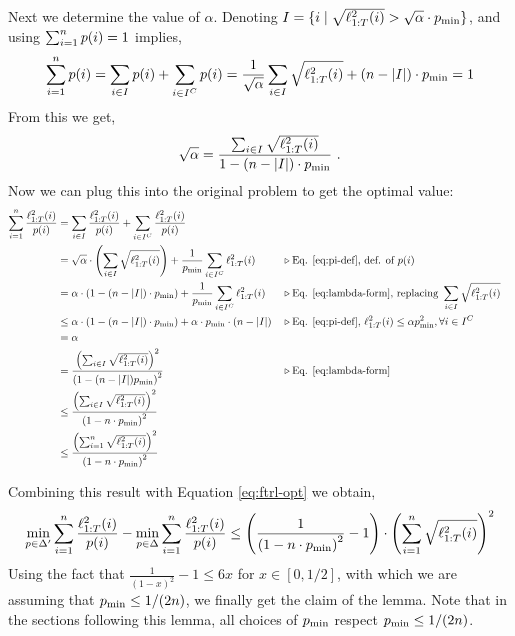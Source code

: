 \begin{proofarg}{}
Next we determine the value of $\alpha$. Denoting $I=\{ i \mid \sqrt{\ell_{1:T}^2(i)}>\sqrt{\alpha} \cdot p_{\text{min}}\}$,  and using   $\sum_{i=1}^n p(i)=1$ implies,
\begin{equation*}
\sum_{i=1}^n p(i) =\sum_{i\in I} p(i) + \sum_{i \in I^C} p(i) = \frac{1}{\sqrt{\alpha}} \sum_{i\in I}\sqrt{\ell_{1:T}^2(i)} + (n-|I|) \cdot p_{\text{min}} = 1
\end{equation*}
From this we get,
\begin{equation} \label{eq:lambda-form}
\sqrt{\alpha} = \frac{\sum_{i\in I}\sqrt{\ell_{1:T}^2(i)}}{1-(n-|I|) \cdot p_{\text{min}}}~.
\end{equation}
Now we can plug this into the original problem to get the optimal value:
\begin{align*}
\sum_{i=1}^n \frac{\ell_{1:T}^2(i) }{p(i)} &= \sum_{i\in I} \frac{\ell_{1:T}^2(i) }{p(i)} + \sum_{i \in I^C} \frac{\ell_{1:T}^2(i) }{p(i)} \\
&= \sqrt{\alpha} \cdot \left( \sum_{i\in I}\sqrt{\ell_{1:T}^2(i)} \right) + \frac{1}{p_{\text{min}}}\sum_{i \in I^C} \ell_{1:T}^2(i) && \triangleright \text{Eq. \ref{eq:pi-def}, def. of }p(i) \\
&=\alpha \cdot   (1-(n-|I|) \cdot  p_{\text{min}})  + \frac{1}{p_{\text{min}}}\sum_{i \in I^C} \ell_{1:T}^2(i) &&  \triangleright\text{Eq. \ref{eq:lambda-form}, replacing }\sum_{i\in I}\sqrt{\ell_{1:T}^2(i)}\\
&\leq \alpha \cdot (1-(n-|I|) \cdot p_{\text{min}})  + \alpha \cdot p_{\text{min}} \cdot (n-|I|) &&  \triangleright\text{Eq. \ref{eq:pi-def}, } \ell_{1:T}^2(i) \leq \alpha p_{\text{min}}^2, \forall i \in I^C \\
&=\alpha \\
&= \frac{\left( \sum_{i\in I}\sqrt{\ell_{1:T}^2(i)} \right)^2}{\left(1-(n-|I|) p_{\text{min}}\right)^2} &&  \triangleright\text{Eq. \ref{eq:lambda-form}} \\
&\leq \frac{\left( \sum_{i\in I}\sqrt{\ell_{1:T}^2(i)} \right)^2}{\left(1- n \cdot p_{\text{min}}\right)^2}\\
&\leq \frac{\left( \sum_{i=1}^n \sqrt{\ell_{1:T}^2(i)} \right)^2}{\left(1- n \cdot p_{\text{min}}\right)^2}
\end{align*}


Combining this result with Equation \eqref{eq:ftrl-opt} we obtain,
\begin{equation*}
\min_{p \in \Delta'} \sum_{i=1}^n \frac{\ell_{1:T}^2(i) }{p(i)} - \min_{p \in \Delta} \sum_{i=1}^n \frac{\ell_{1:T}^2(i)}{p(i)} \leq \left(  \frac{1}{\left(1- n \cdot p_{\text{min}}\right)^2} - 1 \right) \cdot \left( \sum_{i=1}^n \sqrt{\ell_{1:T}^2(i)} \right)^2
\end{equation*}
Using the fact that $\frac{1}{(1-x)^2}-1 \leq 6x$ for $x \in [0, 1/2]$, with which we are assuming that $p_{\text{min}} \leq 1/(2n)$, we finally get the claim of the lemma. Note that in the sections following this lemma, all choices of $p_{\text{min}}$ respect $p_{\text{min}} \leq 1/(2n)$. 
\end{proofarg}

